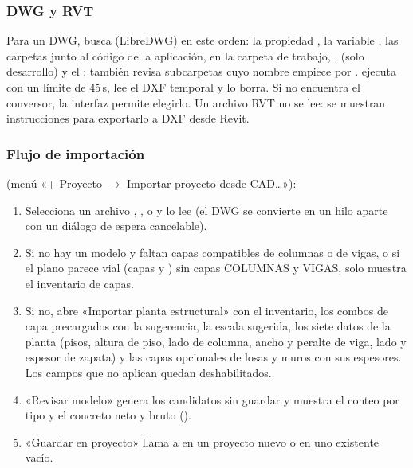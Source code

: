 \subsubsection{DWG y RVT}

Para un DWG,  busca  (LibreDWG) en este orden: la propiedad
, la variable , las carpetas  junto al código de la
aplicación,  en la carpeta de trabajo, ,  (solo
desarrollo) y el ; también revisa subcarpetas cuyo nombre empiece por .
 ejecuta  con un límite de 45\,s,
lee el DXF temporal y lo borra. Si no encuentra el conversor, la interfaz permite elegirlo. Un archivo RVT no se lee:
se muestran instrucciones para exportarlo a DXF desde Revit.

\subsubsection{Flujo de importación}

 (menú «+ Proyecto $\rightarrow$ Importar proyecto desde
CAD\dots»):

\begin{enumerate}
	\item Selecciona un archivo , ,  o  y lo lee (el DWG se convierte en
	      un hilo aparte con un diálogo de espera cancelable).
	\item Si no hay un modelo  y faltan capas compatibles de columnas o de vigas, o si el plano parece vial
	      (capas  y ) sin capas COLUMNAS y VIGAS, solo muestra el inventario de
	      capas.
	\item Si no, abre «Importar planta estructural» con el inventario, los combos de capa precargados con la
	      sugerencia, la escala sugerida, los siete datos de la planta (pisos, altura de piso, lado de columna, ancho y
	      peralte de viga, lado y espesor de zapata) y las capas opcionales de losas y muros con sus espesores. Los
	      campos que no aplican quedan deshabilitados.
	\item «Revisar modelo» genera los candidatos sin guardar y muestra el conteo por tipo y el concreto neto y bruto
	      ().
	\item «Guardar en proyecto» llama a  en un proyecto nuevo o en uno existente vacío.
\end{enumerate}

